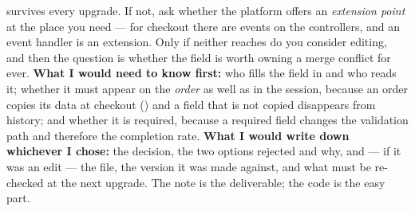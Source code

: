 \begin{ans}
        survives every upgrade. If not, ask whether the platform offers an
        \emph{extension point} at the place you need --- for checkout there are
        events on the controllers, and an event handler is an extension. Only
        if neither reaches do you consider editing, and then the question is
        whether the field is worth owning a merge conflict for ever.
        \textbf{What I would need to know first:} who fills the field in and
        who reads it; whether it must appear on the \emph{order} as well as in
        the session, because an order copies its data at checkout
        () and a field that is not copied disappears from
        history; and whether it is required, because a required field changes
        the validation path and therefore the completion rate.
        \textbf{What I would write down whichever I chose:} the decision, the
        two options rejected and why, and --- if it was an edit --- the file,
        the version it was made against, and what must be re-checked at the
        next upgrade. The note is the deliverable; the code is the easy part.
\end{ans}

